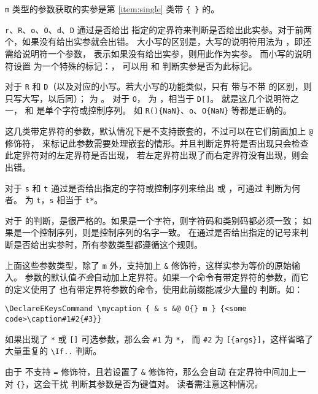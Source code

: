 \documentclass[openany]{book}
\begin{document}
\texttt m 类型的参数获取的实参是第 \ref{item:single} 类带 \verb|{ }| 的。

\texttt r、\texttt R、\texttt o、\texttt O、\texttt d、\texttt D 通过是否给出
指定的定界符来判断是否给出此实参。对于前两个，如果没有给出实参就会出错。
大小写的区别是，大写的说明符用法为 ，即还需给说明符一个参数，
表示如果没有给出实参，则用此作为实参。
而小写的说明符设置  为一个特殊的标记：，
可以用  和  判断实参是否为此标记。

对于 \texttt R 和 \texttt D（以及对应的小写。若大小写的功能类似，只有
带与不带  的区别，则只写大写，以后同）； 为
。
对于 \texttt O， 为 ，相当于 \verb|D[]|。
 就是这几个说明符之一，
 和  是单个字符或控制序列。
如 \verb|R(){NaN}|、\verb|o|、\verb|O{NaN}| 等都是正确的。

这几类带定界符的参数，默认情况下是不支持嵌套的，不过可以在它们前面加上 \texttt @ 修饰符，
来标记此参数需要处理嵌套的情形。并且判断定界符是否出现只会检查此定界符对的左定界符是否出现，
若左定界符出现了而右定界符没有出现，则会出错。

对于 \texttt s 和 \texttt t 通过是否给出指定的字符或控制序列来给出 
或 ，可通过  判断为何者。
 为 \verb|t|，\texttt s 相当于 \verb|t*|。

对于  的判断，是很严格的。如果是一个字符，则字符码和类别码都必须一致；
如果是一个控制序列，则是控制序列的名字一致。
在通过是否给出指定的记号来判断是否给出实参时，所有参数类型都遵循这个规则。

上面这些参数类型，除了 \texttt m 外，支持加上 \texttt\& 修饰符，这样实参为等价的原始输入。
参数的默认值\emph{不会}自动加上定界符。如果一个命令有带定界符的参数，而它的定义使用了
也有带定界符参数的命令，使用此前缀能减少大量的  判断。如：
\begin{Verbatim}
\DeclareEKeysCommand \mycaption { & s &@ O{} m } {<some code>\caption#1#2{#3}}
\end{Verbatim}
如果出现了 \verb|*| 或 \verb|[]| 可选参数，那么会 \verb|#1| 为 \verb|*|，
而 \verb|#2| 为 \verb|[{args}]|，这样省略了大量重复的 \verb|\If..| 判断。

由于  不支持 \texttt= 修饰符，且若设置了 \texttt\& 修饰符，那么会自动
在定界符中间加上一对 \verb|{}|，这会干扰  判断其参数是否为键值对。
读者需注意这种情况。
\end{document}
